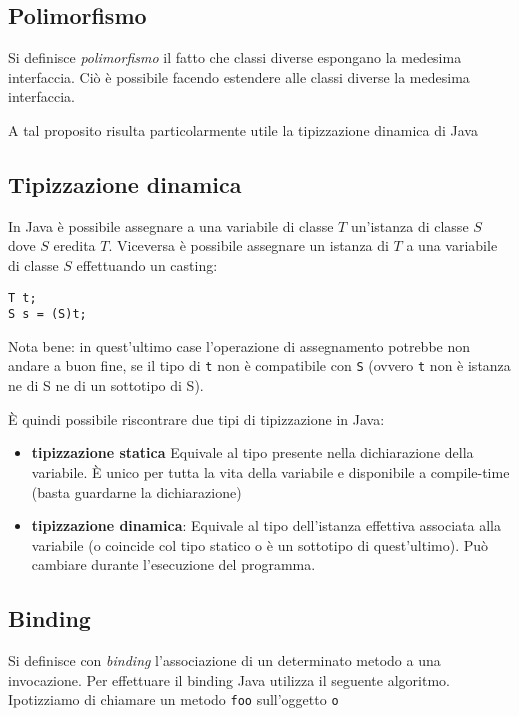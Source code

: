 \documentclass{article}
\begin{document}
\subsection{Polimorfismo}

Si definisce \emph{polimorfismo} il fatto che classi diverse espongano la medesima interfaccia.
Ciò è possibile facendo estendere alle classi diverse la medesima interfaccia.

A tal proposito risulta particolarmente utile la tipizzazione dinamica di Java

\subsection{Tipizzazione dinamica}

In Java è possibile assegnare a una variabile di classe $T$ un'istanza di classe $S$
dove $S$ eredita $T$.
Viceversa è possibile assegnare un istanza di $T$ a una variabile di classe $S$ effettuando un casting:

\begin{lstlisting}
T t;
S s = (S)t;
\end{lstlisting}

Nota bene: in quest'ultimo case l'operazione di assegnamento potrebbe non andare a buon fine,
se il tipo di \texttt{t} non è compatibile con \texttt{S} (ovvero \texttt{t} non è istanza ne di S
ne di un sottotipo di S).

È quindi possibile riscontrare due tipi di tipizzazione in Java:

\begin{itemize}
	\item \textbf{tipizzazione statica} Equivale al tipo presente nella dichiarazione della variabile.
	È unico per tutta la vita della variabile e disponibile a compile-time (basta guardarne la dichiarazione)
	\item \textbf{tipizzazione dinamica}: Equivale al tipo dell'istanza effettiva associata alla variabile (o coincide col tipo statico o è un sottotipo di quest'ultimo).
	Può cambiare durante l'esecuzione del programma.
\end{itemize}

\subsection{Binding}

Si definisce con \emph{binding} l'associazione di un determinato metodo a una invocazione.
Per effettuare il binding Java utilizza il seguente algoritmo.
Ipotizziamo di chiamare un metodo \texttt{foo} sull'oggetto \texttt{o}
\end{document}

